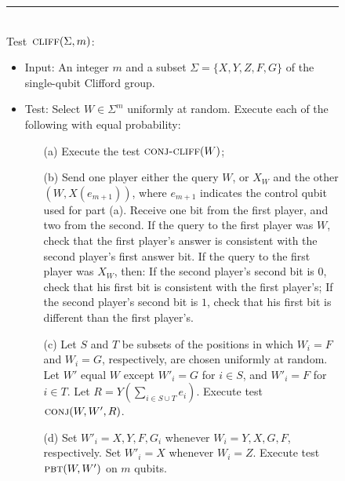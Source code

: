 \documentclass{toc}
\newcommand{\pbt}{\textsc{pbt}}
\newcommand{\conj}{\textsc{conj}}
\newcommand{\conjc}{\textsc{conj-cliff}}
\newcommand{\cliff}{\textsc{cliff}}
\begin{document}
\begin{figure}[H]
\rule[1ex]{\textwidth}{0.5pt}\\
Test~$\cliff(\Sigma,m)$:
\begin{itemize}
    \item Input: An integer $m$ and a subset $\Sigma = \{X,Y,Z,F,G\}$ of the single-qubit Clifford group. 
    \item Test: Select $W \in \Sigma^m$ uniformly at random. Execute each of the following with equal probability:
\begin{enumerate}
\item[(a)] Execute the test $\conjc(W)$;
\item[(b)] Send one player either the query $W$, or $X_W$ and the other $(W,X(e_{m+1}))$, where $e_{m+1}$ indicates the control qubit used for part (a). Receive one bit from the first player, and two from the second. If the query to the first player was $W$, check that the first player's answer is consistent with the second player's first answer bit. If the query to the first player was $X_W$, then: If the second player's second bit is $0$, check that his first bit is consistent with the first player's; If the second player's second bit is $1$, check that his first bit is different than the first player's.
\item[(c)] Let $S$ and $T$ be subsets of the positions in which $W_i=F$ and $W_i=G$, %
 respectively,
are %
chosen uniformly at random. Let $W'$ equal $W$ except $W'_i=G$ for $i\in S$, and $W'_i=F$ for $i\in T$. Let  $R = Y(\sum_{i\in S\cup T} e_i)$. Execute test $\conj(W,W', R)$.
\item[(d)] %
Set $W'_i = X, Y, F, G_i$ whenever $W_i = Y, X, G, F$, respectively.
Set $W'_i = X$ whenever $W_i=Z$. Execute test $\pbt(W,W')$ on $m$ qubits.


\end{enumerate}
\end{itemize}
\end{figure}
\end{document}

